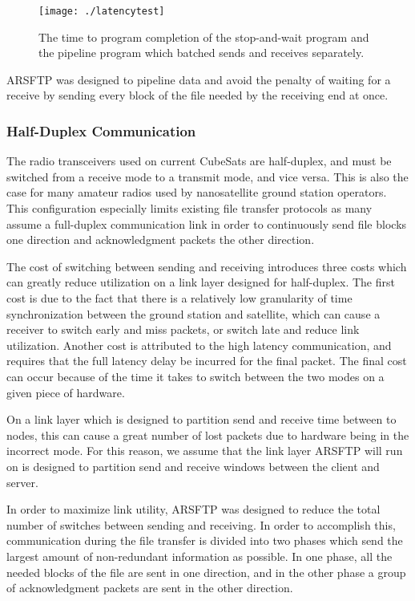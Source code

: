 \documentclass[journal]{./IEEEtran}
\begin{document}
\begin{figure}[h!]
\begin{center}
\texttt{[image: ./latencytest]}
\end{center}
\caption{The time to program completion of the stop-and-wait program and the pipeline program which batched sends and receives separately.}
\label{fig_latencytest}
\end{figure}

ARSFTP was designed to pipeline data and avoid the penalty of waiting for a receive by sending every block of the file needed by the receiving end at once.

\subsubsection{Half-Duplex Communication}

The radio transceivers used on current CubeSats are half-duplex, and must be switched from a receive mode to a transmit mode, and vice versa.  This is also the case for many amateur radios used by nanosatellite ground station operators.  This configuration especially limits existing file transfer protocols as many assume a full-duplex communication link in order to continuously send file blocks one direction and acknowledgment packets the other direction.  

The cost of switching between sending and receiving introduces three costs which can greatly reduce utilization on a link layer designed for half-duplex.  The first cost is due to the fact that there is a relatively low granularity of time synchronization between the ground station and satellite, which can cause a receiver to switch early and miss packets, or switch late and reduce link utilization.  Another cost is attributed to the high latency communication, and requires that the full latency delay be incurred for the final packet.  The final cost can occur because of the time it takes to switch between the two modes on a given piece of hardware.

On a link layer which is designed to partition send and receive time between to nodes, this can cause a great number of lost packets due to hardware being in the incorrect mode.  For this reason, we assume that the link layer ARSFTP will run on is designed to partition send and receive windows between the client and server.

In order to maximize link utility, ARSFTP was designed to reduce the total number of switches between sending and receiving.  In order to accomplish this, communication during the file transfer is divided into two phases which send the largest amount of non-redundant information as possible. In one phase, all the needed blocks of the file are sent in one direction, and in the other phase a group of acknowledgment packets are sent in the other direction.
\end{document}
